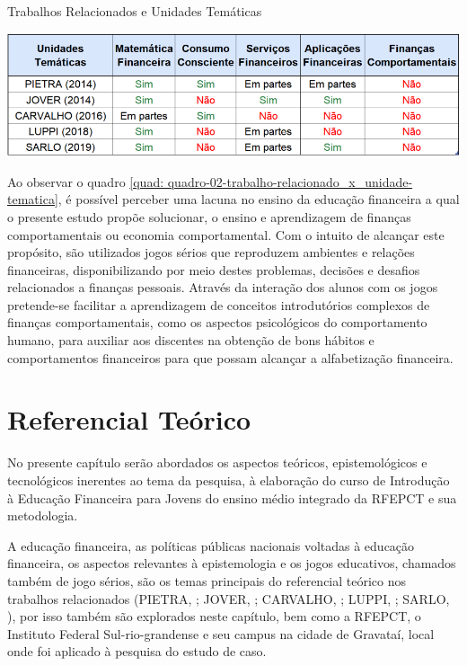 \graphicspath{{quadros/}}
\begin{quadro}[!ht]
\centering
\begin{minipage}{1\textwidth}
\caption{Trabalhos Relacionados e Unidades Temáticas}
\centering
\includegraphics[width=1\textwidth]{quadro-02-trabalhos-relacionados_x_unidades-tema.PNG}
\label{quad: quadro-02-trabalho-relacionado_x_unidade-tematica}
\end{minipage}
\end{quadro}

\newpage

Ao observar o quadro \ref{quad: quadro-02-trabalho-relacionado_x_unidade-tematica}, é possível perceber uma lacuna no ensino da educação financeira a qual o presente estudo propõe solucionar, o ensino e aprendizagem de finanças comportamentais ou economia comportamental. Com o intuito de alcançar este propósito, são utilizados jogos sérios que reproduzem ambientes e relações financeiras, disponibilizando por meio destes problemas, decisões e desafios relacionados a finanças pessoais. Através da interação dos alunos com os jogos pretende-se facilitar a aprendizagem de conceitos introdutórios complexos de finanças comportamentais, como os aspectos psicológicos do comportamento humano, para auxiliar aos discentes na obtenção de bons hábitos e comportamentos financeiros para que possam alcançar a alfabetização financeira.

\chapter{Referencial Teórico}
No presente capítulo serão abordados os aspectos teóricos, epistemológicos e tecnológicos inerentes ao tema da pesquisa, à elaboração do curso de Introdução à Educação Financeira para Jovens do ensino médio integrado da RFEPCT e sua metodologia.

A educação financeira, as políticas públicas nacionais voltadas à educação financeira, os aspectos relevantes à epistemologia e os jogos educativos, chamados também de jogo sérios, são os temas principais do referencial teórico nos trabalhos relacionados (PIETRA, \citeyear{pietras2014}; JOVER, \citeyear{jover2014};  CARVALHO, \citeyear{flavia2016}; LUPPI, \citeyear{luppi2018}; SARLO, \citeyear{sarlo2019}), por isso também são explorados neste capítulo, bem como a RFEPCT, o Instituto Federal Sul-rio-grandense e seu campus na cidade de Gravataí, local onde foi aplicado à pesquisa do estudo de caso.

